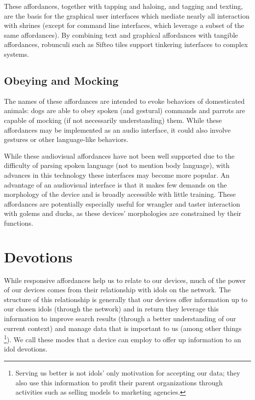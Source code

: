 These affordances, together with tapping and haloing, and tagging and texting, are the basis for the graphical user interfaces which mediate nearly all interaction with shrines (except for command line interfaces, which leverage a subset of the same affordances). By combining text and graphical affordances with tangible affordances, robunculi such as Sifteo tiles support tinkering interfaces to complex systems.

\subsection{Obeying and Mocking}
%
The names of these affordances are intended to evoke behaviors of domesticated animals: dogs are able to obey spoken (and gestural) commands and parrots are capable of mocking (if not necessarily understanding) them. While these affordances may be implemented as an audio interface, it could also involve gestures or other language-like behaviors.

While these audiovisual affordances have not been well supported due to the difficulty of parsing spoken language (not to mention body language), with advances in this technology these interfaces may become more popular. An advantage of an audiovisual interface is that it makes few demands on the morphology of the device and is broadly accessible with little training. These affordances are potentially especially useful for wrangler and taster interaction with golems and ducks, as these devices' morphologies are constrained by their functions.

\section{Devotions}
\label{sec:devotions}
%
While responsive affordances help us to relate to our devices, much of the power of our devices comes from their relationship with idols on the network. 
The structure of this relationship is generally that our devices offer information up to our chosen idols (through the network) and in return they leverage this information to improve search results (through a better understanding of our current context) and manage data that is important to us (among other things%
\footnote{Serving us better is not idols' only motivation for accepting our data; they also use this information to profit their parent organizations through activities such as selling models to marketing agencies.}).
We call these modes that a device can employ to offer up information to an idol devotions.

